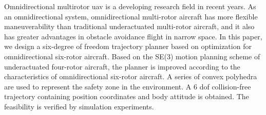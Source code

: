 \begin{eabstract}
  Omnidirectional multirotor uav is a developing research 
  field in recent years. As an omnidirectional system, 
  omnidirectional multi-rotor aircraft has more flexible 
  maneuverability than traditional underactuated multi-rotor 
  aircraft, and it also has greater advantages in obstacle 
  avoidance flight in narrow space. In this paper, 
  we design a six-degree of freedom trajectory planner 
  based on optimization for omnidirectional six-rotor aircraft.
   Based on the SE(3) motion planning scheme of underactuated 
   four-rotor aircraft, the planner is improved according to the
    characteristics of omnidirectional six-rotor aircraft. 
    A series of convex polyhedra are used to represent the
     safety zone in the environment. A 6 dof collision-free 
     trajectory containing position coordinates and body attitude 
     is obtained. The feasibility is verified by simulation 
     experiments.

\end{eabstract}
